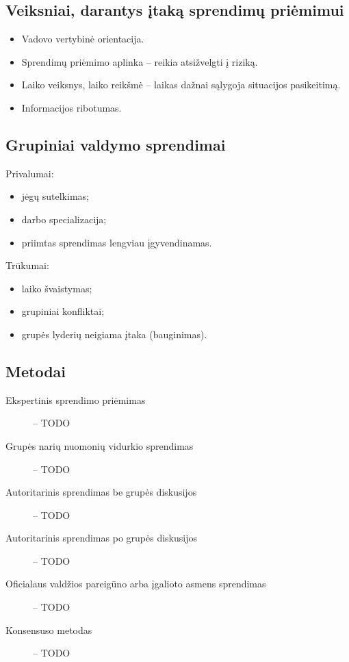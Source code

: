 \subsection{Veiksniai, darantys įtaką sprendimų priėmimui}

\begin{itemize}
  \item Vadovo vertybinė orientacija.
  \item Sprendimų priėmimo aplinka – reikia atsižvelgti į riziką.
  \item Laiko veiksnys, laiko reikšmė – laikas dažnai sąlygoja situacijos
    pasikeitimą.
  \item Informacijos ribotumas.
\end{itemize}

\subsection{Grupiniai valdymo sprendimai}

Privalumai:
\begin{itemize}
  \item jėgų sutelkimas;
  \item darbo specializacija;
  \item priimtas sprendimas lengviau įgyvendinamas.
\end{itemize}

Trūkumai:
\begin{itemize}
  \item laiko švaistymas;
  \item grupiniai konfliktai;
  \item grupės lyderių neigiama įtaka (bauginimas).
\end{itemize}

\subsection{Metodai}

\begin{description}
  \item[Ekspertinis sprendimo priėmimas] – TODO
  \item[Grupės narių nuomonių vidurkio sprendimas] – TODO
  \item[Autoritarinis sprendimas be grupės diskusijos] – TODO
  \item[Autoritarinis sprendimas po grupės diskusijos] – TODO
  \item[Oficialaus valdžios pareigūno arba įgalioto asmens sprendimas] –
    TODO
  \item[Konsensuso metodas] – TODO
\end{description}

